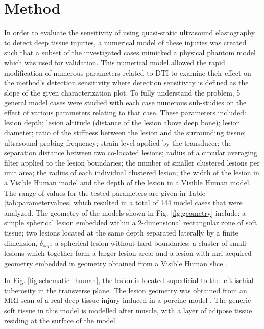 	\section{Method}
	\label{sec:method}
		In order to evaluate the sensitivity of using quasi-static ultrasound elastography to detect deep tissue injuries, a numerical model of these injuries was created such that a subset of the investigated cases mimicked a physical phantom model which was used for validation. This numerical model allowed the rapid modification of numerous parameters related to DTI to examine their effect on the method's detection sensitivity where detection sensitivity is defined as the slope of the given characterization plot. To fully understand the problem, 5 general model cases  were studied with each case  numerous sub-studies on the effect of various parameters relating to that case. These parameters included: lesion depth; lesion altitude (distance of the lesion above deep bone); lesion diameter; ratio of the stiffness between the lesion and the surrounding tissue; ultrasound probing frequency; strain level applied by the transducer; the separation distance between two co-located lesions; radius of a circular averaging filter applied to the lesion boundaries; the number of smaller clustered lesions per unit area; the radius of each individual clustered lesion; the width of the lesion in a Visible Human \cite{visiblehuman} model and the depth of the lesion in a Visible Human model. The range of values for the tested parameters are given in Table \ref{tab:parametervalues} which resulted in a total of 144 model cases that were analyzed. The geometry of the models shown in Fig. \ref{fig:geometry} include: a simple spherical lesion embedded within a 2-dimensional rectangular zone of soft tissue; two lesions located at the same depth separated laterally by a finite dimension, $\delta_{sep}$; a spherical lesion without hard boundaries; a cluster of small lesions which together form a larger lesion area; and a lesion with mri-acquired geometry \cite{solis13} embedded in geometry obtained from a Visible Human slice \cite{visiblehuman}.

		In Fig. \ref{fig:schematic_human}, the lesion is located superficial to the left ischial tuberosity in the transverse plane. The lesion geometry was obtained from an MRI scan of a real deep tissue injury induced in a porcine model \cite{solis13}. The generic soft tissue in this model is modelled after muscle, with a layer of adipose tissue residing at the surface of the model.

